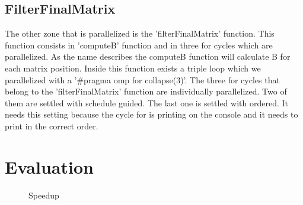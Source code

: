 \documentclass[twocolumn]{article}
\begin{document}
    \subsection{FilterFinalMatrix}\label{subsec:filterfinalmatrix}
    The other zone that is parallelized is the 'filterFinalMatrix' function.
    This function consists in 'computeB' function and in three for cycles which are parallelized.
    As the name describes the computeB function will calculate B for each matrix position.
    Inside this function exists a triple loop which we parallelized with a '\#pragma omp for collapse(3)'.
    The three for cycles that belong to the 'filterFinalMatrix' function are individually parallelized.
    Two of them are settled with schedule guided.
    The last one is settled with ordered.
    It needs this setting because the cycle for is printing on the console and it needs to print in the correct order.

    \section{Evaluation}\label{sec:evaluation}

    \begin{figure}[h]
        \caption{Speedup}
        \label{fig:Ng2}
    \end{figure}
\end{document}

